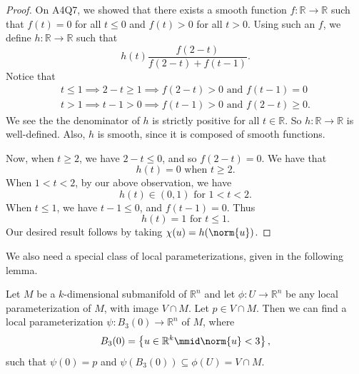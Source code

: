 \documentclass[notoc,notitlepage]{tufte-book}
\begin{document}
\begin{proof}
  On A4Q7, we showed that there exists a smooth function $f : \mathbb{R} \to
  \mathbb{R}$ such that $f(t) = 0$ for all $t \leq 0$ and $f(t) > 0$ for all $t
  > 0$. Using such an $f$, we define $h : \mathbb{R} \to \mathbb{R}$ such that 
  \begin{equation*}
    h(t) \frac{f(2 - t)}{f(2 - t) + f(t - 1)}.
  \end{equation*}
  Notice that
  \begin{gather*}
    t \leq 1 \implies 2 - t \geq 1 \implies f(2 - t) > 0 \text{ and } f(t - 1) = 0 \\
    t > 1 \implies t - 1 > 0 \implies f(t - 1) > 0 \text{ and } f(2 - t) \geq 0.
  \end{gather*}
  We see the the denominator of $h$ is strictly positive for all $t \in
  \mathbb{R}$. So $h: \mathbb{R} \to \mathbb{R}$ is well-defined. Also, $h$ is
  smooth, since it is composed of smooth functions.

  Now, when $t \geq 2$, we have $2 - t \leq 0$, and so $f(2 - t) = 0$. We have
  that
  \begin{equation*}
    h(t) = 0 \text{ when } t \geq 2.
  \end{equation*}
  When $1 < t < 2$, by our above observation, we have
  \begin{equation*}
    h(t) \in (0, 1) \text{ for } 1 < t < 2.
  \end{equation*}
  When $t \leq 1$, we have $t - 1 \leq 0$, and $f(t - 1) = 0$. Thus
  \begin{equation*}
    h(t) = 1 \text{ for } t \leq 1.
  \end{equation*}
  Our desired result follows by taking $\chi(u) = h(\norm{u})$.
\end{proof}

We also need a special class of local parameterizations, given in the following
lemma.

\begin{lemma}\label{lemma:special_parameterizations_to_construct_partitions_of_unity}
  Let $M$ be a $k$-dimensional submanifold of $\mathbb{R}^n$ and let $\phi : U
  \to \mathbb{R}^n$ be any local parameterization of $M$, with image $V \cap M$.
  Let $p \in V \cap M$. Then we can find a local parameterization $\psi : B_3(0)
  \to \mathbb{R}^n$ of $M$, where
  \begin{equation*}
    B_3(0) = \left\{ u \in \mathbb{R}^k \mmid \norm{u} < 3 \right\},
  \end{equation*}
  such that $\psi(0) = p$ and $\psi(B_3(0)) \subseteq \phi(U) = V \cap M$.
\end{lemma}
\end{document}
